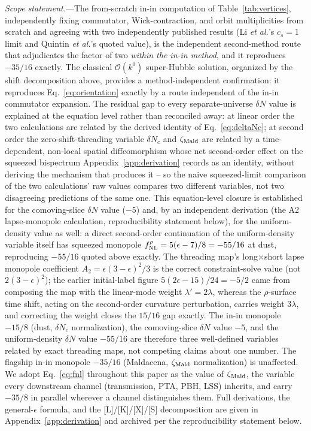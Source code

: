 \documentclass[aps,prd,twocolumn,superscriptaddress,nofootinbib,longbibliography]{revtex4-2}
\begin{document}
\textit{Scope statement.}---The from-scratch in-in computation of
Table~\ref{tab:vertices}, independently fixing commutator, Wick-contraction,
and orbit multiplicities from scratch and agreeing with two independently
published results (Li \textit{et al.}'s $c_s=1$ limit and Quintin
\textit{et al.}'s quoted value), is the independent second-method route that
adjudicates the factor of two \emph{within the in-in method}, and it
reproduces $-35/16$ exactly. The classical $\mathcal O(k^0)$
super-Hubble solution, organized by the shift decomposition above, provides
a method-independent confirmation: it reproduces Eq.~\eqref{eq:orientation}
exactly by a route independent of the in-in commutator expansion. The
residual gap to every separate-universe $\delta N$ value is explained at the
equation level rather than reconciled away: at linear order the two
calculations are related by the derived identity of Eq.~\eqref{eq:deltaNc};
at second order the zero-shift-threading variable $\delta N_c$ and
$\zeta_{\rm Mald}$ are related by a time-dependent, non-local spatial
diffeomorphism whose net second-order effect on the squeezed bispectrum
Appendix~\ref{app:derivation} records as an identity, without deriving the
mechanism that produces it -- so the naive squeezed-limit comparison of the
two calculations' raw values compares two different variables, not two
disagreeing predictions of the same one. This equation-level closure is
established for the comoving-slice $\delta N$ value ($-5$)
and, by an independent derivation
(the A2 lapse-monopole calculation, reproducibility statement below),
for the uniform-density value as well: a direct second-order continuation of the
uniform-density variable itself has squeezed monopole $f_{\rm NL}^\rho=5(\epsilon-7)/8=-55/16$
at dust, reproducing $-55/16$ quoted above exactly. The threading map's long$\times$short
lapse monopole coefficient $A_2=\epsilon(3-\epsilon)^2/3$ is the correct constraint-solve
value (not $2(3-\epsilon)^2$); the earlier initial-label figure $5(2\epsilon-15)/24=-5/2$
came from composing the map with the linear-mode weight $\lambda'=2\lambda$, whereas the
$\rho$-surface time shift, acting on the second-order curvature perturbation, carries
weight $3\lambda$, and correcting the weight closes the $15/16$ gap exactly. The in-in
monopole $-15/8$ (dust, $\delta N_c$ normalization), the comoving-slice $\delta N$ value
$-5$, and the uniform-density $\delta N$ value $-55/16$ are therefore three well-defined
variables related by exact threading maps, not competing claims about one number. The
flagship in-in monopole $-35/16$ (Maldacena, $\zeta_{\rm Mald}$ normalization) is unaffected. We adopt
Eq.~\eqref{eq:fnl} throughout this paper as the value of $\zeta_{\rm Mald}$,
the variable every downstream channel (transmission, PTA, PBH, LSS)
inherits, and carry $-35/8$ in parallel wherever a channel distinguishes
them. Full derivations, the general-$\epsilon$ formula, and the
[L]/[K]/[X]/[S] decomposition are given in Appendix~\ref{app:derivation} and
archived per the reproducibility statement below.
\end{document}
